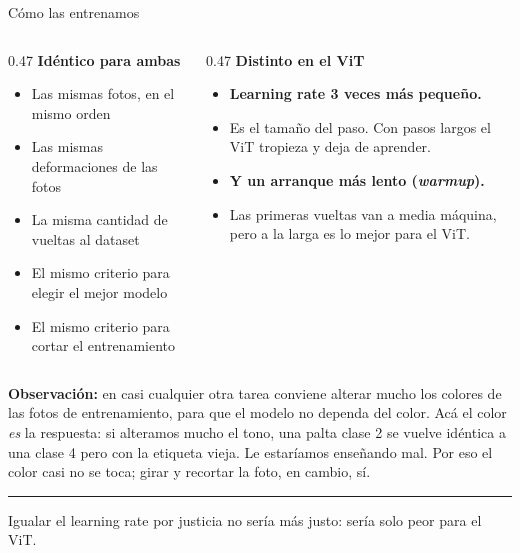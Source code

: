 \documentclass[aspectratio=169,11pt,table]{beamer}
\newcommand{\cierre}[1]{%
  \vfill
  {\color{verdecla}\rule{2.5pt}{0.9em}}\hspace{0.4em}%
  {\footnotesize\color{grisSuave}#1}%
}
\begin{document}
\begin{frame}{Cómo las entrenamos}
\begin{columns}[T]
\begin{column}{0.47\textwidth}
{\small\textbf{Idéntico para ambas}}
{\scriptsize
\setlength{\itemsep}{0.16em}
\begin{itemize}
  \item Las mismas fotos, en el mismo orden
  \item Las mismas deformaciones de las fotos
  \item La misma cantidad de vueltas al dataset
  \item El mismo criterio para elegir el mejor modelo
  \item El mismo criterio para cortar el entrenamiento
\end{itemize}
}
\end{column}
\begin{column}{0.47\textwidth}
{\small\textbf{Distinto en el ViT}}
{\scriptsize
\setlength{\itemsep}{0.16em}
\begin{itemize}
  \item {\bfseries Learning rate 3 veces más pequeño.}
  \item Es el tamaño del paso. Con pasos largos el ViT tropieza y deja de aprender.
  \item {\bfseries Y un arranque más lento (\emph{warmup}).}
  \item Las primeras vueltas van a media máquina, pero a la larga es lo mejor para el ViT.
\end{itemize}
}
\end{column}
\end{columns}
\vspace{0.4em}
{\scriptsize\textbf{Observación:} en casi cualquier otra tarea conviene alterar mucho los colores de las fotos de entrenamiento, para que el modelo no dependa del color. Acá el color \emph{es} la respuesta: si alteramos mucho el tono, una palta clase 2 se vuelve idéntica a una clase 4 pero con la etiqueta vieja. Le estaríamos enseñando mal. Por eso el color casi no se toca; girar y recortar la foto, en cambio, sí.}
\cierre{Igualar el learning rate \guillemotleft{}por justicia\guillemotright{} no sería más justo: sería solo peor para el ViT.}
\end{frame}

{
\begin{frame}[plain]
  \vfill
  \vfill
\end{frame}
}
\end{document}
